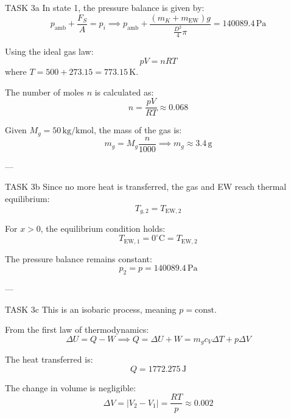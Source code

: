 TASK 3a  
In state 1, the pressure balance is given by:  
\[
p_{\text{amb}} + \frac{F_S}{A} = p_i \implies p_{\text{amb}} + \frac{(m_K + m_{\text{EW}}) g}{\frac{D^2}{4} \pi} = 140089.4 \, \text{Pa}
\]  

Using the ideal gas law:  
\[
p V = n R T
\]  
where \( T = 500 + 273.15 = 773.15 \, \text{K} \).  

The number of moles \( n \) is calculated as:  
\[
n = \frac{p V}{R T} \approx 0.068
\]  

Given \( M_g = 50 \, \text{kg/kmol} \), the mass of the gas is:  
\[
m_g = M_g \frac{n}{1000} \implies m_g \approx 3.4 \, \text{g}
\]  

---

TASK 3b  
Since no more heat is transferred, the gas and EW reach thermal equilibrium:  
\[
T_{g,2} = T_{\text{EW},2}
\]  

For \( x > 0 \), the equilibrium condition holds:  
\[
T_{\text{EW},1} = 0^\circ\text{C} = T_{\text{EW},2}
\]  

The pressure balance remains constant:  
\[
p_2 = p = 140089.4 \, \text{Pa}
\]  

---

TASK 3c  
This is an isobaric process, meaning \( p = \text{const} \).  

From the first law of thermodynamics:  
\[
\Delta U = Q - W \implies Q = \Delta U + W = m_g c_V \Delta T + p \Delta V
\]  

The heat transferred is:  
\[
Q = 1772.275 \, \text{J}
\]  

The change in volume is negligible:  
\[
\Delta V = \left| V_2 - V_1 \right| = \frac{R T}{p} \approx 0.002
\]